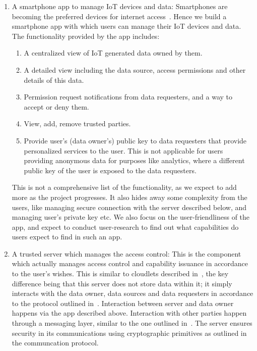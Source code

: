 \begin{enumerate}
	\item A smartphone app to manage IoT devices and data: Smartphones are becoming the preferred devices for internet access~\cite{statcount}. Hence we build a smartphone app with which users can manage their IoT devices and data. The functionality provided by the app includes:

	\begin{enumerate}
		\item A centralized view of IoT generated data owned by them.

		\item A detailed view including the data source, access permissions and other details of this data.

		\item Permission request notifications from data requesters, and a way to accept or deny them.

		\item View, add, remove trusted parties.

		\item Provide user's (data owner's) public key to data requesters that provide personalized services to the user. This is not applicable for users providing anonymous data for purposes like analytics, where a different public key of the user is exposed to the data requesters.

	\end{enumerate}

	This is not a comprehensive list of the functionality, as we expect to add more as the project progresses. It also hides away some complexity from the users, like managing secure connection with the server described below, and managing user's private key etc. We also focus on the user-friendliness of the app, and expect to conduct user-research to find out what capabilities do users expect to find in such an app.
	
	\item A trusted server which manages the access control: This is the component which actually manages access control and capability issuance in accordance to the user's wishes. This is similar to cloudlets described in~\cite{davies}, the key difference being that this server does not store data within it; it simply interacts with the data owner, data sources and data requesters in accordance to the protocol outlined in~\cite{campbell}. Interaction between server and data owner happens via the app described above. Interaction with other parties happen through a messaging layer, similar to the one outlined in~\cite{campbell}. The server ensures security in its communications using cryptographic primitives as outlined in the communcation protocol.


\end{enumerate}
